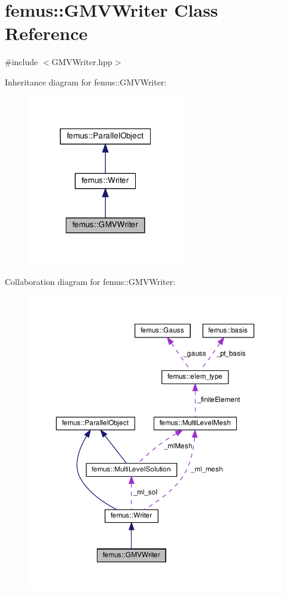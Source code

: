 \hypertarget{classfemus_1_1_g_m_v_writer}{}\section{femus\+:\+:G\+M\+V\+Writer Class Reference}
\label{classfemus_1_1_g_m_v_writer}


{\ttfamily \#include $<$G\+M\+V\+Writer.\+hpp$>$}



Inheritance diagram for femus\+:\+:G\+M\+V\+Writer\+:
\nopagebreak
\begin{figure}[H]
\begin{center}
\leavevmode
\includegraphics[width=193pt]{classfemus_1_1_g_m_v_writer__inherit__graph}
\end{center}
\end{figure}


Collaboration diagram for femus\+:\+:G\+M\+V\+Writer\+:
\nopagebreak
\begin{figure}[H]
\begin{center}
\leavevmode
\includegraphics[width=350pt]{classfemus_1_1_g_m_v_writer__coll__graph}
\end{center}
\end{figure}
